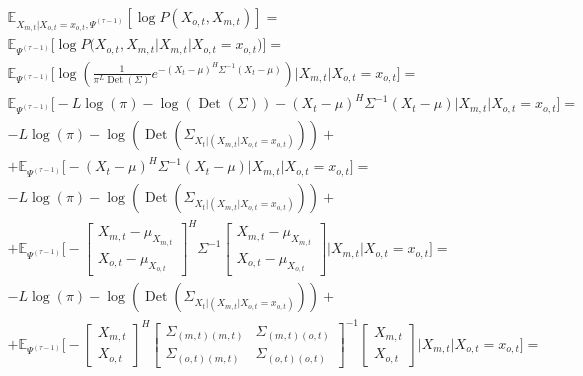 \documentclass[11pt]{article}
\newcommand{\Expect}{\mathbb{E}}
\DeclareMathOperator{\Det}{Det}
\begin{document}
\begin{equation*}
\begin{gathered}
\Expect_{X_{m,t}|X_{o,t}=x_{o,t}, \Psi^{(\tau-1)}}[\log P(X_{o,t}, X_{m,t})]=\\
\Expect_{\Psi^{(\tau-1)}}\Big[\log P\Big(X_{o,t}, X_{m,t}\Big|X_{m,t}|X_{o,t}=x_{o,t}\Big)\Big]=\\
\Expect_{\Psi^{(\tau-1)}}\bigg[\log \left(\frac{1}{\pi^{L}\Det(\Sigma)}e^{-(X_t-\mu)^H\Sigma^{-1}(X_t-\mu)}\right)\Big|X_{m,t}|X_{o,t}=x_{o,t}\bigg]=\\
\Expect_{\Psi^{(\tau-1)}}\bigg[-L \log(\pi) - \log (\Det(\Sigma)) - (X_t - \mu)^H\Sigma^{-1}(X_t - \mu)\Big|X_{m,t}|X_{o,t}=x_{o,t}\bigg]=\\
-L \log(\pi) - \log (\Det(\Sigma_{X_t|(X_{m,t}|X_{o,t}=x_{o,t})})) + \\ + \Expect_{\Psi^{(\tau-1)}}\bigg[- (X_t - \mu)^H\Sigma^{-1}(X_t - \mu)\Big|X_{m,t}|X_{o,t}=x_{o,t}\bigg]=\\
-L \log(\pi) - \log (\Det(\Sigma_{X_t|(X_{m,t}|X_{o,t}=x_{o,t})}))  + \\ + \Expect_{\Psi^{(\tau-1)}}\bigg[- 
\begin{bmatrix} X_{m,t} - \mu_{X_{m,t}} \\  X_{o,t} - \mu_{X_{o,t}} \end{bmatrix}^H \Sigma^{-1}
\begin{bmatrix} X_{m,t} - \mu_{X_{m,t}} \\  X_{o,t} - \mu_{X_{o,t}} \end{bmatrix}\Big|X_{m,t}|X_{o,t}=x_{o,t}\bigg] = \\
-L \log(\pi) - \log (\Det(\Sigma_{X_t|(X_{m,t}|X_{o,t}=x_{o,t})}))  + \\ + \Expect_{\Psi^{(\tau-1)}}\bigg[- 
\begin{bmatrix} X_{m,t} \\  X_{o,t} \end{bmatrix}^H
\begin{bmatrix} \Sigma_{(m,t)(m,t)} & \Sigma_{(m,t)(o,t)} \\  \Sigma_{(o,t)(m,t)} & \Sigma_{(o,t)(o,t)} \end{bmatrix}^{-1}
\begin{bmatrix} X_{m,t} \\  X_{o,t} \end{bmatrix}\Big|X_{m,t}|X_{o,t}=x_{o,t}\bigg] = \\
\end{gathered}
\end{equation*}
\end{document}
